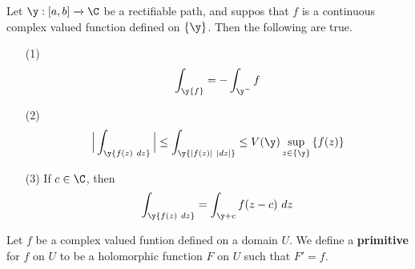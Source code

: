 \begin{lemma}\label{4.2.3}
    Let $\y:[a,b] \xrightarrow{} \C$ be a rectifiable path, and suppos that $f$
    is a continuous complex valued function defined on  $\{\y\}$. Then the
    following are true.
    \begin{enumerate}
        \item[(1)] $$\int_\y{f}=-\int_{\y^-}{f}$$

        \item[(2)] $$\Big{|} \int_\y{f(z) \ dz} \Big{|} \leq \int_\y{|f(z)| \ |dz|}
            \leq V(\y)\sup_{z \in \{\y\}}{\{f(z)\}}$$

        \item[(3)] If $c \in \C$, then $$\int_\y{f(z) \ dz}=
            \int_{\y+c} {f(z-c) \ dz}$$
    \end{enumerate}
\end{lemma}

\begin{definition}
    Let $f$ be a complex valued funtion defined on a domain  $U$. We define a
     \textbf{primitive} for $f$ on  $U$ to be a holomorphic function  $F$ on $U$
     such that  $F'=f$.
\end{definition}


